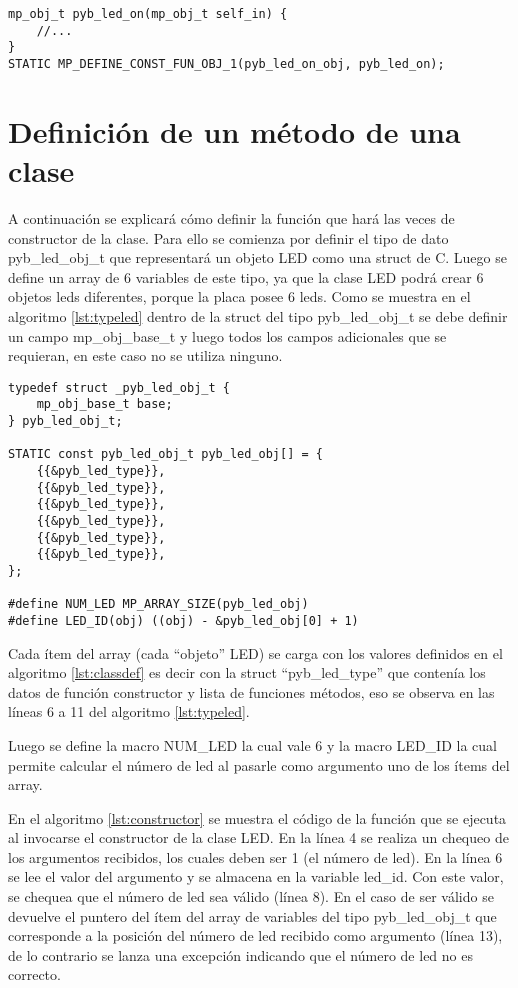 \begin{lstlisting}[label={lst:ledon},caption=Función que se ejecuta al invocar el método on().] 
mp_obj_t pyb_led_on(mp_obj_t self_in) {
    //...
}
STATIC MP_DEFINE_CONST_FUN_OBJ_1(pyb_led_on_obj, pyb_led_on);
\end{lstlisting}

\section{Definición de un método de una clase}

A continuación se explicará cómo definir la función que hará las veces de constructor de la clase. Para ello se comienza por definir el tipo de dato pyb\_led\_obj\_t que representará un objeto LED como una struct de C.
Luego se define un array de 6 variables de este tipo, ya que la clase LED podrá crear 6 objetos leds diferentes, porque la placa posee 6 leds. Como se muestra en el algoritmo \ref{lst:typeled} dentro de la struct del tipo pyb\_led\_obj\_t se debe definir un campo mp\_obj\_base\_t y luego todos los campos adicionales que se requieran, en este caso no se utiliza ninguno.

\begin{lstlisting}[label={lst:typeled},caption=Definición de un array de objetos LED para C.] 
typedef struct _pyb_led_obj_t {
    mp_obj_base_t base;
} pyb_led_obj_t;

STATIC const pyb_led_obj_t pyb_led_obj[] = {
    {{&pyb_led_type}},
    {{&pyb_led_type}},
    {{&pyb_led_type}},
    {{&pyb_led_type}},
    {{&pyb_led_type}},
    {{&pyb_led_type}},
};

#define NUM_LED MP_ARRAY_SIZE(pyb_led_obj)
#define LED_ID(obj) ((obj) - &pyb_led_obj[0] + 1)
\end{lstlisting}

Cada ítem del array (cada “objeto” LED) se carga con los valores definidos en el algoritmo \ref{lst:classdef} es decir con la struct “pyb\_led\_type”  que contenía los datos de función constructor y lista de funciones métodos, eso se observa en las líneas 6 a 11 del algoritmo \ref{lst:typeled}.

Luego se define la macro NUM\_LED la cual vale 6 y la macro LED\_ID la cual permite calcular el número de led al pasarle como argumento uno de los ítems del array.

En el algoritmo \ref{lst:constructor} se muestra el código de la función que se ejecuta al invocarse el constructor de la clase LED. En la línea 4 se realiza un chequeo de los argumentos recibidos, los cuales deben ser 1 (el número de led). En la línea 6 se lee el valor del argumento y se almacena en la variable led\_id. Con este valor, se chequea que el número de led sea válido (línea 8). En el caso de ser válido se devuelve el puntero del ítem del array de variables del tipo pyb\_led\_obj\_t que corresponde a la posición del número de led recibido como argumento (línea 13), de lo contrario se lanza una excepción indicando que el número de led no es correcto.

